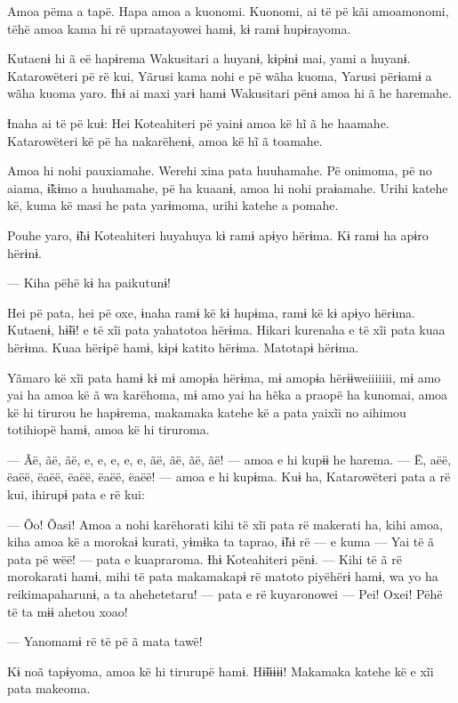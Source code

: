  

Amoa pëma a tapë. Hapa amoa a kuonomi. Kuonomi, ai të pë kãi amoamonomi,
tëhë amoa kama hi rë upraatayowei hamɨ, kɨ ramɨ hupɨrayoma. 

Kutaenɨ hi ã eë hapɨrema Wakusitari a huyanɨ, kɨpɨnɨ mai, yami a huyanɨ.
Katarowëteri pë rë kui, Yãrusi kama nohi e pë wãha kuoma, Yarusi përɨamɨ
a wãha kuoma yaro. Ɨhɨ ai maxi yarɨ hamɨ Wakusitari pënɨ amoa hi ã he
haremahe.

Ɨnaha ai të pë kuɨ: Hei Koteahiteri pë yainɨ amoa kë hĩ ã he haamahe.
Katarowëteri kë pë ha nakarëhenɨ, amoa kë hĩ ã toamahe. 

Amoa hi nohi pauxiamahe. Werehi xina pata huuhamahe. Pë onimoma, pë no
aiama, ɨ̃kɨmo a huuhamahe, pë ha kuaanɨ, amoa hi nohi praɨamahe. Urihi
katehe kë, kuma kë masi he pata yarɨmoma, urihi katehe a pomahe. 

Pouhe yaro, ɨ̃hɨ Koteahiteri huyahuya kɨ ramɨ apɨyo hërɨma. Kɨ ramɨ ha
apɨro hërɨnɨ. 

--- Kiha pëhë kɨ ha paikutunɨ! 

Hei pë pata, hei pë oxe, ɨnaha ramɨ kë kɨ hupɨma, ramɨ kë kɨ apɨyo
hërɨma. Kutaenɨ, hɨ̃ɨɨ! e të xĩi pata yahatotoa hërɨma. Hikari kurenaha e
të xĩi pata kuaa hërɨma. Kuaa hërɨpë hamɨ, kɨpɨ katito hërɨma. Matotapɨ
hërɨma. 

Yãmaro kë xĩi pata hamɨ kɨ mɨ amopɨa hërɨma, mɨ amopɨa hërɨɨweiiiiiii,
mɨ amo yai ha amoa kë ã wa karëhoma, mɨ amo yai ha hẽka a praopë ha
kunomai, amoa kë hi tirurou he hapɨrema, makamaka katehe kë a pata
yaixĩi no aihimou totihiopë hamɨ, amoa kë hi tiruroma. 

--- Ãë, ãë, ãë, e, e, e, e, e, ãë, ãë, ãë, ãë! --- amoa e hi kupɨɨ he
harema. --- Ë, aëë, ëaëë, ëaëë, ëaëë, ëaëë, ëaëë! --- amoa e hi kupɨma.
Kuɨ ha, Katarowëteri pata a rë kui, ihirupɨ pata e rë kui: 

--- Õo! Õasi! Amoa a nohi karëhorati kihi të xĩi pata rë makerati ha,
kihi amoa, kiha amoa kë a morokaɨ kurati, yɨmɨka ta taprao, ɨ̃hɨ rë --- e
kuma --- Yai të ã pata pë wëë! --- pata e kuapraroma. Ɨhɨ Koteahiteri
pënɨ. --- Kihi të ã rë morokarati hamɨ, mihi të pata makamakapɨ rë
matoto piyëhërɨ hamɨ, wa yo ha reikimapaharunɨ, a ta ahehetetaru! ---
pata e rë kuyaronowei --- Pei! Oxei! Pëhë të ta mɨɨ ahetou xoao! 

--- Yanomamɨ rë të pë ã mata tawë! 

Kɨ noã tapɨyoma, amoa kë hi tirurupë hamɨ. Hɨ̃ɨɨɨɨɨ! Makamaka katehe kë e
xĩi pata makeoma. 

